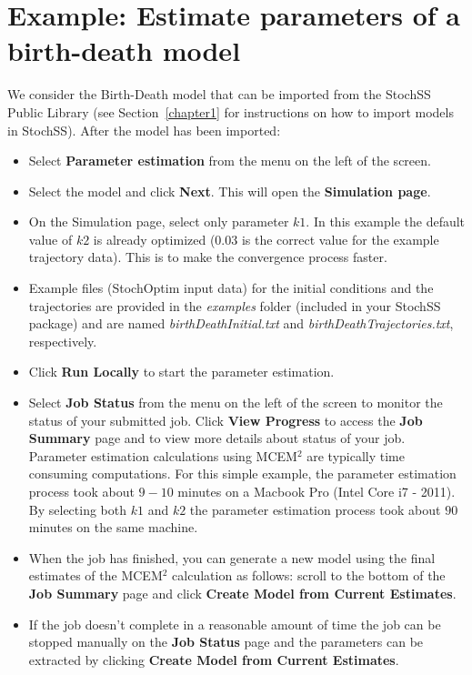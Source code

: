 \section{Example: Estimate parameters of a birth-death model}
We consider the Birth-Death model that can be imported from the StochSS Public Library (see Section~\ref{chapter1} for instructions on how to import models in StochSS).
After the model has been imported:
\begin{itemize}
\item Select \textbf{Parameter estimation} from the menu on the left of the screen.
\item Select the model and click \textbf{Next}. This will open the \textbf{Simulation page}.
\item On the Simulation page, select only parameter $k1$. In this example the default value of $k2$ is already optimized (0.03 is the correct value for the example trajectory data). This is to make the convergence process faster. %
\item Example files (StochOptim input data) for the initial conditions and the trajectories are provided in the \textit{examples} folder (included in your StochSS package) and are named \textit{birthDeathInitial.txt} and \textit{birthDeathTrajectories.txt}, respectively.
\item Click \textbf{Run Locally} to start the parameter estimation.
\item Select \textbf{Job Status} from the menu on the left of the screen to monitor the status of your submitted job.
Click \textbf{View Progress} to access the \textbf{Job Summary} page and to view more details about status of your job. Parameter estimation calculations using MCEM$^2$ are typically time consuming computations. For this simple example, the parameter estimation process took about $9-10$ minutes on a Macbook Pro (Intel Core i7 - 2011). By selecting both $k1$ and $k2$ the parameter estimation process took about $90$ minutes on the same machine.

\item When the job has finished, you can generate a new model using the final estimates of the MCEM$^2$ calculation as follows: scroll to the bottom of the \textbf{Job Summary} page and click \textbf{Create Model from Current Estimates}. 
\item If the job doesn't complete in a reasonable amount of time the job can be stopped manually on the \textbf{Job Status} page and the parameters can be extracted by clicking \textbf{Create Model from Current Estimates}.
\end{itemize}

